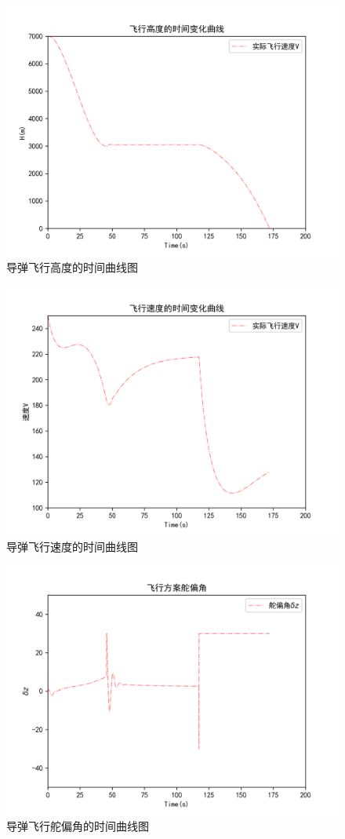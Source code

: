 \documentclass[UTF8]{ctexart}
\begin{document}
\begin{figure}[H]
    \centering
    \includegraphics[width=130mm]{code/飞行高度.png}
    \caption{导弹飞行高度的时间曲线图}
\end{figure}
\begin{figure}[H]
    \centering
    \includegraphics[width=130mm]{code/飞行速度.png}
    \caption{导弹飞行速度的时间曲线图}
\end{figure}
\begin{figure}[H]
    \centering
    \includegraphics[width=130mm]{code/飞行舵偏角.png}
    \caption{导弹飞行舵偏角的时间曲线图}
\end{figure}
\end{document}
